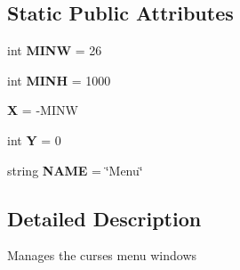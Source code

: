 \subsection*{\-Static \-Public \-Attributes}
\begin{DoxyCompactItemize}
\item 
\hypertarget{classplugins_1_1menu_1_1_menu_view_ab3438cfcc2b703482d6d1ecab9679d66}{int {\bfseries \-M\-I\-N\-W} = 26}\label{classplugins_1_1menu_1_1_menu_view_ab3438cfcc2b703482d6d1ecab9679d66}

\item 
\hypertarget{classplugins_1_1menu_1_1_menu_view_a307f27961873f3d00395c2cd019a66cf}{int {\bfseries \-M\-I\-N\-H} = 1000}\label{classplugins_1_1menu_1_1_menu_view_a307f27961873f3d00395c2cd019a66cf}

\item 
\hypertarget{classplugins_1_1menu_1_1_menu_view_ab9c4a00d5b07171198ac2f6255dbca4a}{{\bfseries \-X} = -\/\-M\-I\-N\-W}\label{classplugins_1_1menu_1_1_menu_view_ab9c4a00d5b07171198ac2f6255dbca4a}

\item 
\hypertarget{classplugins_1_1menu_1_1_menu_view_aa138149f8ea669dacc4bed733952c76f}{int {\bfseries \-Y} = 0}\label{classplugins_1_1menu_1_1_menu_view_aa138149f8ea669dacc4bed733952c76f}

\item 
\hypertarget{classplugins_1_1menu_1_1_menu_view_a78be57e5f75c472e43e9907735035710}{string {\bfseries \-N\-A\-M\-E} = \char`\"{}\-Menu\char`\"{}}\label{classplugins_1_1menu_1_1_menu_view_a78be57e5f75c472e43e9907735035710}

\end{DoxyCompactItemize}


\subsection{\-Detailed \-Description}
\begin{DoxyVerb}Manages the curses menu windows \end{DoxyVerb}
 

